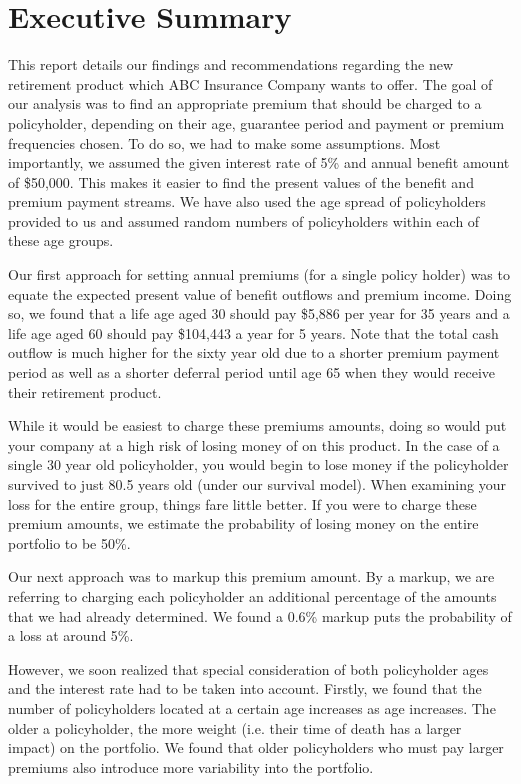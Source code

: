 \documentclass[12pt]{article}
\begin{document}


\tableofcontents

\newpage
\section{Executive Summary}

This report details our findings and recommendations regarding the new retirement product which ABC Insurance Company wants to offer. The goal of our analysis was to find an appropriate premium that should be charged to a policyholder, depending on their age, guarantee period and payment or premium frequencies chosen. To do so, we had to make some assumptions. Most importantly, we assumed the given interest rate of 5\% and annual benefit amount of \$50,000. This makes it easier to find the present values of the benefit and premium payment streams. We have also used the age spread of policyholders provided to us and assumed random numbers of policyholders within each of these age groups.

Our first approach for setting annual premiums (for a single policy holder) was to equate the expected present value of benefit outflows and premium income. Doing so, we found that a life age aged 30 should pay \$5,886 per year for 35 years and a life age aged 60 should pay \$104,443 a year for 5 years. Note that the total cash outflow is much higher for the sixty year old due to a shorter premium payment period as well as a shorter deferral period until age 65 when they would receive their retirement product.

While it would be easiest to charge these premiums amounts, doing so would put your company at a high risk of losing money of on this product. In the case of a single 30 year old policyholder, you would begin to lose money if the policyholder survived to just 80.5 years old (under our survival model). When examining your loss for the entire group, things fare little better. If you were to charge these premium amounts, we estimate the probability of losing money on the entire portfolio to be 50\%. 

Our next approach was to markup this premium amount. By a markup, we are referring to charging each policyholder an additional percentage of the amounts that we had already determined. We found a 0.6\% markup puts the probability of a loss at around 5\%.

However, we soon realized that special consideration of both policyholder ages and the interest rate had to be taken into account. Firstly, we found that the number of policyholders located at a certain age increases as age increases. The older a policyholder, the more weight (i.e. their time of death has a larger impact) on the portfolio. We found that older policyholders who must pay larger premiums also introduce more variability into the portfolio.
\end{document}
